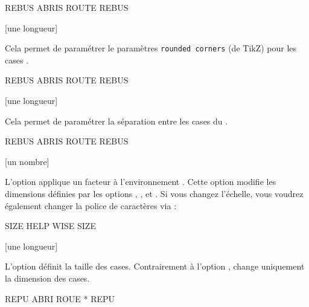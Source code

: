 \documentclass[svgnames]{report}
\begin{document}
  \begin{example}
  \begin{wordle}[Police=\large\ttfamily]{REBUS}
    ABRIS
    ROUTE
    REBUS
  \end{wordle}
  \end{example}

  [une longueur]

  Cela permet de paramétrer le paramètres \texttt{rounded corners} (de TikZ) pour les cases .

  \begin{example}
  \begin{wordle}[Arrondi=2.5mm]{REBUS}
    ABRIS
    ROUTE
    REBUS
  \end{wordle}
  \end{example}

  [une longueur]

  Cela permet de paramétrer la séparation entre les cases du .

  \begin{example}
  \begin{wordle}[Separation=2mm,CouleurBordures=black]{REBUS}
    ABRIS
    ROUTE
    REBUS
  \end{wordle}
  \end{example}

  [un nombre]

  L'option  applique un facteur à l'environnement .
  Cette option modifie les dimensions définies par les options ,
  ,  et . Si vous changez l'échelle, vous voudrez également changer la police de caractères via  :

  \begin{example}
  \begin{wordle}[Echelle=1.5,Police=\huge\bfseries]{SIZE}
     HELP
     WISE
     SIZE
  \end{wordle}
  \end{example}

  [une longueur]

  L'option  définit la taille des cases. Contrairement à l'option ,  change uniquement la dimension des cases.

  \begin{example}
  \begin{wordle}[Taille=10mm,Police=\huge\bfseries]{REPU}
     ABRI ROUE * REPU
  \end{wordle}
  \end{example}
\end{document}
